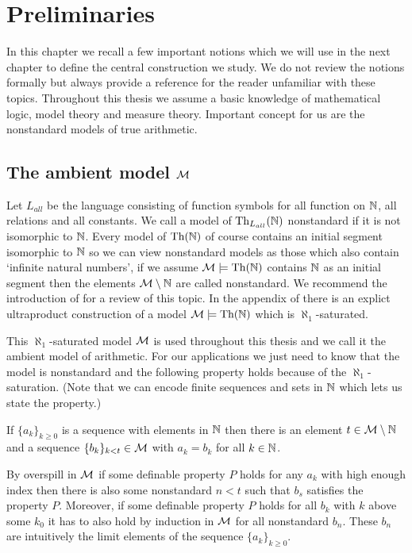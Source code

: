 \chapter*{Preliminaries}

In this chapter we recall a few important notions which we will use in the next chapter to define the central construction we study. We do not review the notions formally but always provide a reference for the reader unfamiliar with these topics. Throughout this thesis we assume a basic knowledge of mathematical logic, model theory and measure theory. Important concept for us are the nonstandard models of true arithmetic. 

\section*{The ambient model $\mathcal{M}$}

Let $L_{all}$ be the language consisting of function symbols for all function on $\mathbb{N}$, all relations and all constants. We call a model of $\text{Th}_{L_{all}}(\mathbb{N})$ nonstandard if it is not isomorphic to $\mathbb{N}$. Every model of $\text{Th}(\mathbb{N})$ of course contains an initial segment isomorphic to $\mathbb{N}$ so we can view nonstandard models as those which also contain `infinite natural numbers', if we assume $\mathcal{M}\models \text{Th}(\mathbb{N})$ contains $\mathbb{N}$ as an initial segment then the elements $\mathcal{M}\setminus \mathbb{N}$ are called nonstandard. We recommend the introduction of \cite{kaye1991pa} for a review of this topic. In the appendix of \cite{krajicek2010forcing} there is an explict ultraproduct construction of a model $\mathcal{M}\models \text{Th}(\mathbb{N})$ which is $\aleph_1$-saturated.

This $\aleph_1$-saturated model $\mathcal{M}$ is used throughout this thesis and we call it the ambient model of arithmetic. For our applications we just need to know that the model is nonstandard and the following property holds because of the $\aleph_1$-saturation. (Note that we can encode finite sequences and sets in $\mathbb{N}$ which lets us state the property.)

\begin{prope}
If $\{a_k\}_{k\geq 0}$ is a sequence with elements in $\mathbb{N}$ then there is an element $t\in \mathcal{M} \setminus \mathbb{N}$ and a sequence $\{b_k\}_{k<t}\in \mathcal{M}$ with $a_k=b_k$ for all $k\in \mathbb{N}$.
\end{prope}

By overspill in $\mathcal{M}$ if some definable property $P$ holds for any $a_k$ with high enough index then there is also some nonstandard $n<t$ such that $b_s$ satisfies the property $P$. Moreover, if some definable property $P$ holds for all $b_k$ with $k$ above some $k_0$ it has to also hold by induction in $\mathcal{M}$ for all nonstandard $b_n$. These $b_n$ are intuitively the limit elements of the sequence $\{a_k\}_{k\geq0}$.

